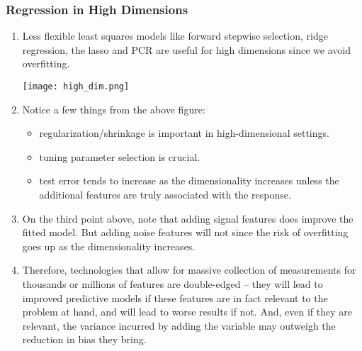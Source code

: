 \documentclass[10pt]{article}
\begin{document}
\subsubsection{Regression in High Dimensions} 
\begin{enumerate}
	\item Less flexible least squares models like forward stepwise selection, ridge regression, the lasso and PCR are useful for high dimensions since we avoid overfitting.
	
	\texttt{[image: high\_dim.png]}

	\item Notice a few things from the above figure: \begin{itemize}
		\item regularization/shrinkage is important in high-dimensional settings.
		\item tuning parameter selection is crucial.
		\item test error tends to increase as the dimensionality increases unless the additional features are truly associated with the response.
	\end{itemize}

	\item On the third point above, note that adding signal features does improve the fitted model.  But adding noise features will not since the risk of overfitting goes up as the dimensionality increases.
	\item Therefore, technologies that allow for massive collection of measurements for thousands or millions of features are double-edged -- they will lead to improved predictive models if these features are in fact relevant to the problem at hand, and will lead to worse results if not. And, even if they are relevant, the variance incurred by adding the variable may outweigh the reduction in bias they bring.
\end{enumerate}
\end{document}
